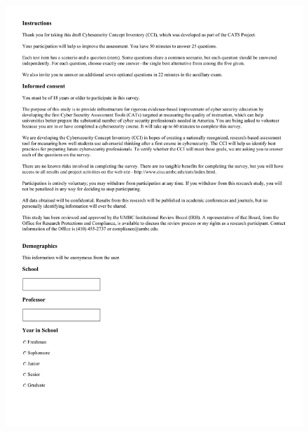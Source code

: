\FloatBarrier
\begin{figure}[!h]
    \begin{center}
    \advance\leftskip-3cm
    \advance\rightskip-3cm
    \includegraphics[scale=.25]{images/exam/correctly_formated_exam-01.jpg}
    \label{fig:correctly_formated_exam-01}
\end{center}
\end{figure}

